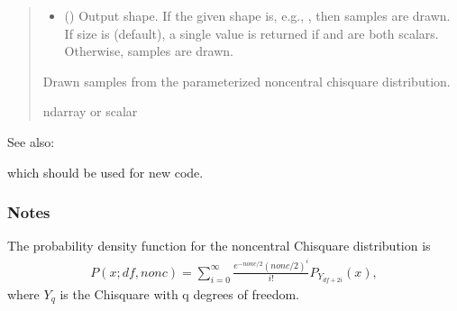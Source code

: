 \documentclass[letterpaper,10pt,english]{sphinxmanual}
\begin{document}
\begin{fulllineitems}
\begin{quote}
\begin{description}
\begin{itemize}
\item {} 
\sphinxAtStartPar
{} (\sphinxstyleliteralemphasis{\sphinxupquote{, }}) \textendash{} Output shape.  If the given shape is, e.g., , then
 samples are drawn.  If size is  (default),
a single value is returned if  and  are both scalars.
Otherwise,  samples are drawn.

\end{itemize}

\sphinxAtStartPar
{} \textendash{} Drawn samples from the parameterized noncentral chi\sphinxhyphen{}square distribution.

\sphinxAtStartPar
ndarray or scalar

\end{description}\end{quote}


\begin{sphinxseealso}{See also:}
\begin{description}
\sphinxAtStartPar
which should be used for new code.

\end{description}


\end{sphinxseealso}

\subsubsection*{Notes}

\sphinxAtStartPar
The probability density function for the noncentral Chi\sphinxhyphen{}square
distribution is
\begin{equation*}
\begin{split}P(x;df,nonc) = \sum^{\infty}_{i=0}
\frac{e^{-nonc/2}(nonc/2)^{i}}{i!}
P_{Y_{df+2i}}(x),\end{split}
\end{equation*}
\sphinxAtStartPar
where \(Y_{q}\) is the Chi\sphinxhyphen{}square with q degrees of freedom.

\end{fulllineitems}
\end{document}
